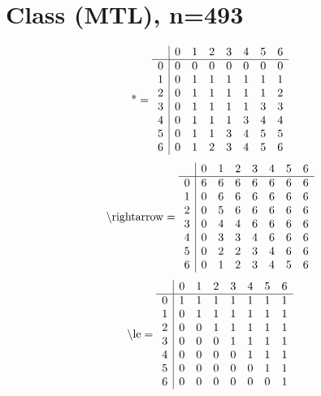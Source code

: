 \documentclass[11pt]{article}
\begin{document}
\section{Class (MTL), n=493}
\[\text{*} = 
\begin{array}{r | r r r r r r r}
 & 0 & 1 & 2 & 3 & 4 & 5 & 6 \\ \hline
0 & 0 & 0 & 0 & 0 & 0 & 0 & 0 \\
1 & 0 & 1 & 1 & 1 & 1 & 1 & 1 \\
2 & 0 & 1 & 1 & 1 & 1 & 1 & 2 \\
3 & 0 & 1 & 1 & 1 & 1 & 3 & 3 \\
4 & 0 & 1 & 1 & 1 & 3 & 4 & 4 \\
5 & 0 & 1 & 1 & 3 & 4 & 5 & 5 \\
6 & 0 & 1 & 2 & 3 & 4 & 5 & 6 \\
\end{array}
\]
\[\text{\textbackslash rightarrow} = 
\begin{array}{r | r r r r r r r}
 & 0 & 1 & 2 & 3 & 4 & 5 & 6 \\ \hline
0 & 6 & 6 & 6 & 6 & 6 & 6 & 6 \\
1 & 0 & 6 & 6 & 6 & 6 & 6 & 6 \\
2 & 0 & 5 & 6 & 6 & 6 & 6 & 6 \\
3 & 0 & 4 & 4 & 6 & 6 & 6 & 6 \\
4 & 0 & 3 & 3 & 4 & 6 & 6 & 6 \\
5 & 0 & 2 & 2 & 3 & 4 & 6 & 6 \\
6 & 0 & 1 & 2 & 3 & 4 & 5 & 6 \\
\end{array}
\]
\[\text{\textbackslash le} = 
\begin{array}{r | r r r r r r r}
 & 0 & 1 & 2 & 3 & 4 & 5 & 6 \\ \hline
0 & 1 & 1 & 1 & 1 & 1 & 1 & 1 \\
1 & 0 & 1 & 1 & 1 & 1 & 1 & 1 \\
2 & 0 & 0 & 1 & 1 & 1 & 1 & 1 \\
3 & 0 & 0 & 0 & 1 & 1 & 1 & 1 \\
4 & 0 & 0 & 0 & 0 & 1 & 1 & 1 \\
5 & 0 & 0 & 0 & 0 & 0 & 1 & 1 \\
6 & 0 & 0 & 0 & 0 & 0 & 0 & 1 \\
\end{array}
\]
\end{document}

